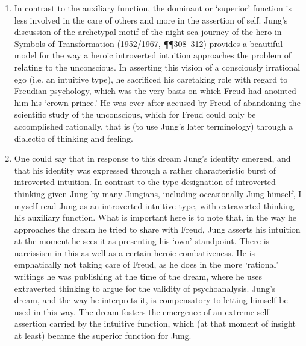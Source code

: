 \begin{enumerate}

\item {} In
contrast to the auxiliary function, the dominant or ‘superior’ function is less
involved in the care of others and more in the assertion of self. Jung’s
discussion of the archetypal motif of the night-sea journey of the hero in
Symbols of Transformation (1952/1967, ¶¶308–312) provides a beautiful model for
the way a heroic introverted intuition approaches the problem of relating to
the unconscious. In asserting this vision of a consciously irrational ego (i.e.
an intuitive type), he sacrificed his caretaking role with regard to Freudian
psychology, which was the very basis on which Freud had anointed him his ‘crown
prince.’ He was ever after accused by Freud of abandoning the scientific study
of the unconscious, which for Freud could only be accomplished rationally, that
is (to use Jung’s later terminology) through a dialectic of thinking and
feeling.

\item {} One could say that in response to this
dream Jung’s identity emerged, and that his identity was expressed through a
rather characteristic burst of introverted intuition. In contrast to the type
designation of introverted thinking given Jung by many Jungians, including
occasionally Jung himself, I myself read Jung as an introverted intuitive type,
with extraverted thinking his auxiliary function. What is important here is to
note that, in the way he approaches the dream he tried to share with Freud,
Jung asserts his intuition at the moment he sees it as presenting his ‘own’
standpoint. There is narcissism in this as well as a certain heroic
combativeness. He is emphatically not taking care of Freud, as he does in the
more ‘rational’ writings he was publishing at the time of the dream, where he
uses extraverted thinking to argue for the validity of psychoanalysis. Jung’s
dream, and the way he interprets it, is compensatory to letting himself be used
in this way. The dream fosters the emergence of an extreme self-assertion
carried by the intuitive function, which (at that moment of insight at least)
became the superior function for Jung.


\end{enumerate}
